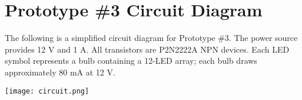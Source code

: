 \chapter{Prototype \#3 Circuit Diagram}

\clearpage

The following is a simplified circuit diagram for Prototype \#3. The power source provides 12 V and 1 A. All transistors are P2N2222A NPN devices. Each LED symbol represents a bulb containing a 12-LED array; each bulb draws approximately 80 mA at 12 V.

\vspace{1cm}

\centering
\texttt{[image: circuit.png]}